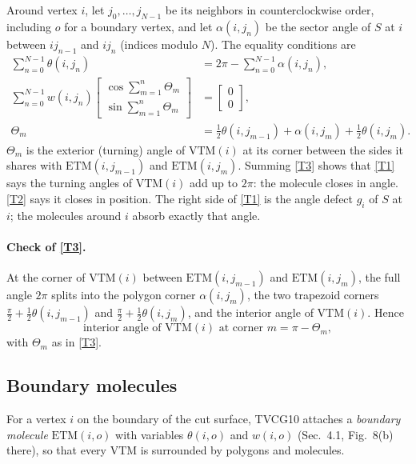 \documentclass[11pt]{article}
\theoremstyle{definition}
\newcommand{\ETM}{\mathrm{ETM}}
\newcommand{\VTM}{\mathrm{VTM}}
\begin{document}
Around vertex $i$, let $j_0, \dots, j_{N-1}$ be its neighbors in
counterclockwise order, including $o$ for a boundary vertex, and let
$\alpha(i,j_n)$ be the sector angle of $S$ at $i$ between $ij_{n-1}$ and $ij_n$
(indices modulo $N$). The equality conditions are
\begin{align}
  \sum_{n=0}^{N-1} \theta(i,j_n) &= 2\pi - \sum_{n=0}^{N-1} \alpha(i,j_n),
  \tag{T1}\label{T1}\\
  \sum_{n=0}^{N-1} w(i,j_n)
    \begin{bmatrix} \cos \sum_{m=1}^{n} \Theta_m \\
                    \sin \sum_{m=1}^{n} \Theta_m \end{bmatrix}
  &= \begin{bmatrix} 0 \\ 0 \end{bmatrix},
  \tag{T2}\label{T2}\\
  \Theta_m &= \tfrac12\theta(i,j_{m-1}) + \alpha(i,j_m) + \tfrac12\theta(i,j_m).
  \tag{T3}\label{T3}
\end{align}
$\Theta_m$ is the exterior (turning) angle of $\VTM(i)$ at its corner between
the sides it shares with $\ETM(i,j_{m-1})$ and $\ETM(i,j_m)$. Summing \eqref{T3}
shows that \eqref{T1} says the turning angles of $\VTM(i)$ add up to $2\pi$: the
molecule closes in angle. \eqref{T2} says it closes in position. The right side
of \eqref{T1} is the angle defect $g_i$ of $S$ at $i$; the molecules around $i$
absorb exactly that angle.

\paragraph{Check of \eqref{T3}.} At the corner of $\VTM(i)$ between
$\ETM(i,j_{m-1})$ and $\ETM(i,j_m)$, the full angle $2\pi$ splits into the
polygon corner $\alpha(i,j_m)$, the two trapezoid corners
$\frac{\pi}{2} + \frac12\theta(i,j_{m-1})$ and
$\frac{\pi}{2} + \frac12\theta(i,j_m)$, and the interior angle of $\VTM(i)$.
Hence
\begin{equation}
  \text{interior angle of } \VTM(i) \text{ at corner } m = \pi - \Theta_m ,
  \label{eq:interior}
\end{equation}
with $\Theta_m$ as in \eqref{T3}.

\subsection{Boundary molecules}

For a vertex $i$ on the boundary of the cut surface, TVCG10 attaches a
\emph{boundary molecule} $\ETM(i,o)$ with variables $\theta(i,o)$ and $w(i,o)$
(Sec.~4.1, Fig.~8(b) there), so that every $\VTM$ is surrounded by polygons and
molecules.
\end{document}
